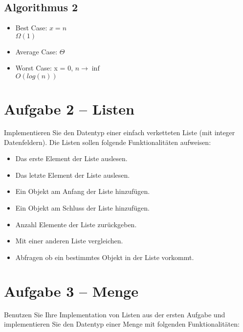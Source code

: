 \subsection*{Algorithmus 2}
\begin{itemize}
	\item Best Case:  $x = n$ \\
		  $\Omega(1)$
	\item Average Case:
		  $\Theta$
	\item Worst Case: x = 0, $n \rightarrow \inf$ \\
		  $O(log(n))$
\end{itemize}
\newpage

\section*{Aufgabe 2 – Listen}
Implementieren Sie den Datentyp einer einfach verketteten Liste (mit integer Datenfeldern). Die Listen sollen folgende Funktionalitäten aufweisen:\\

\begin{itemize}
	\item
		Das erste Element der Liste auslesen.
	\item
		Das letzte Element der Liste auslesen.
	\item
		Ein Objekt am Anfang der Liste hinzufügen.
	\item
		Ein Objekt am Schluss der Liste hinzufügen.
	\item
		Anzahl Elemente der Liste zurückgeben.
	\item
		Mit einer anderen Liste vergleichen.
	\item
		Abfragen ob ein bestimmtes Objekt in der Liste vorkommt.
\end{itemize}




\newpage

\section*{Aufgabe 3 – Menge}
Benutzen Sie Ihre Implementation von Listen aus der ersten Aufgabe und implementieren Sie den Datentyp einer Menge mit folgenden Funktionalitäten:

